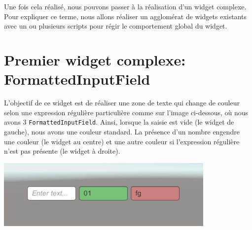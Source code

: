 \documentclass[a4paper,10pt]{article}
\begin{document}
Une fois cela réalisé, nous pouvons passer à la réalisation d'un widget complexe. Pour expliquer ce terme, nous allons réaliser un agglomérat de widgets existants avec un ou plusieurs scripts pour régir le comportement global du widget.

\section{Premier widget complexe: FormattedInputField}

L'objectif de ce widget est de réaliser une zone de texte qui change de couleur selon une expression régulière particulière comme sur l'image ci-dessous, où nous avons 3 \texttt{FormattedInputField}. Ainsi, lorsque la saisie est vide (le widget de gauche), nous avons une couleur standard. La présence d'un nombre engendre une couleur (le widget au centre) et une autre couleur si l'expression régulière n'est pas présente (le widget à droite).
\begin{center}
	\includegraphics[width=0.4\linewidth]{fig/widget_formattetinputfield_start}
\end{center}
\end{document}

